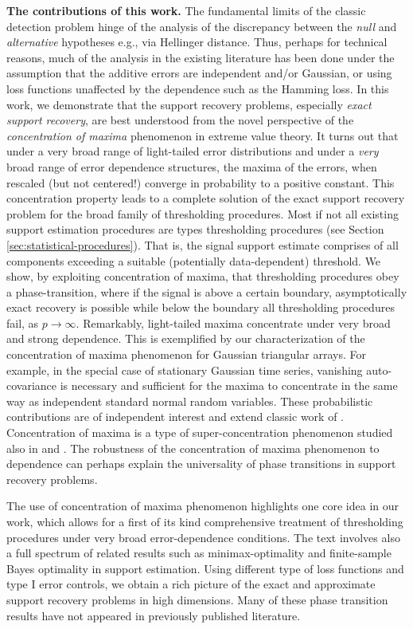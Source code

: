      
{\bf The contributions of this work.} The fundamental limits of the classic detection problem hinge 
of the analysis of the discrepancy between the {\em null} and {\em alternative} hypotheses e.g., via Hellinger distance.  Thus, perhaps 
for  technical reasons, much of the analysis in the existing literature has been done under the assumption that the additive errors are 
independent and/or Gaussian, or using loss functions unaffected by the dependence such as the Hamming loss.  
In this work, we demonstrate that the support recovery problems, especially {\em exact support recovery}, are best understood from 
the novel perspective of the {\em concentration of maxima} phenomenon in extreme value theory.  It turns out that under a very broad 
range of light-tailed error distributions and under a {\em very} broad range of error dependence structures, the maxima of the errors, 
when rescaled (but not centered!) converge in probability to a positive constant. This concentration property leads to a complete solution 
of the exact  support recovery problem for the broad family of thresholding procedures.  Most if not all existing support estimation 
procedures are types thresholding procedures (see Section \ref{sec:statistical-procedures}).   
That is, the signal support estimate comprises of all components exceeding a suitable (potentially data-dependent)  threshold.  We show, by exploiting concentration of maxima, that thresholding procedures obey a phase-transition, where if the signal is above a 
certain boundary, asymptotically exact recovery is possible while below the boundary all thresholding procedures fail, as $p\to\infty$.  
Remarkably, light-tailed maxima concentrate under very broad and strong dependence.  This is exemplified by our characterization of
the concentration of maxima phenomenon for Gaussian triangular arrays.  For example, in the special case of stationary Gaussian time
series, vanishing auto-covariance is necessary and sufficient for the maxima to concentrate in the same way as independent standard 
normal random variables.   These probabilistic contributions are of independent interest and extend classic work of \cite{berman1964limit}. 
Concentration of maxima is a type of super-concentration phenomenon studied also in \cite{chatterjee2014superconcentration} 
and \cite{tanguy:2015}. The robustness of the concentration of maxima phenomenon to dependence can perhaps explain the universality 
of phase transitions in support recovery problems. 

The use of concentration of maxima phenomenon highlights one core idea in our work, which allows for a first of its kind comprehensive 
treatment of thresholding procedures under very broad error-dependence conditions.  The text involves also a full spectrum of related results 
such as minimax-optimality and finite-sample Bayes optimality in support estimation.  Using different type of loss functions and type I error 
controls, we obtain a rich picture of the exact and approximate support recovery problems in high dimensions.  
Many of these phase transition results have not appeared in previously published literature.  

